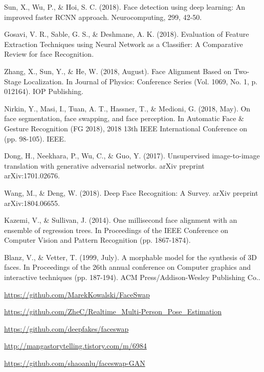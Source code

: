 \documentclass{oblivoir}
\begin{document}
\begin{thebibliography}{}
    Sun, X., Wu, P., \& Hoi, S. C. (2018). Face detection using deep learning: An improved faster RCNN approach. Neurocomputing, 299, 42-50.
        
    Gosavi, V. R., Sable, G. S., \& Deshmane, A. K. (2018). Evaluation of Feature Extraction Techniques using Neural Network as a Classifier: A Comparative Review for face Recognition.

    Zhang, X., Sun, Y., \& He, W. (2018, August). Face Alignment Based on Two-Stage Localization. In Journal of Physics: Conference Series (Vol. 1069, No. 1, p. 012164). IOP Publishing.

    Nirkin, Y., Masi, I., Tuan, A. T., Hassner, T., \& Medioni, G. (2018, May). On face segmentation, face swapping, and face perception. In Automatic Face \& Gesture Recognition (FG 2018), 2018 13th IEEE International Conference on (pp. 98-105). IEEE.

    Dong, H., Neekhara, P., Wu, C., \& Guo, Y. (2017). Unsupervised image-to-image translation with generative adversarial networks. arXiv preprint arXiv:1701.02676.

    Wang, M., \& Deng, W. (2018). Deep Face Recognition: A Survey. arXiv preprint arXiv:1804.06655.

    Kazemi, V., \& Sullivan, J. (2014). One millisecond face alignment with an ensemble of regression trees. In Proceedings of the IEEE Conference on Computer Vision and Pattern Recognition (pp. 1867-1874).

    Blanz, V., \& Vetter, T. (1999, July). A morphable model for the synthesis of 3D faces. In Proceedings of the 26th annual conference on Computer graphics and interactive techniques (pp. 187-194). ACM Press/Addison-Wesley Publishing Co..

    \url{https://github.com/MarekKowalski/FaceSwap}

    \url{https://github.com/ZheC/Realtime_Multi-Person_Pose_Estimation}

    \url{https://github.com/deepfakes/faceswap}

    \url{http://mangastorytelling.tistory.com/m/6984}

    \url{https://github.com/shaoanlu/faceswap-GAN}

\end{thebibliography}
    
\end{document}
